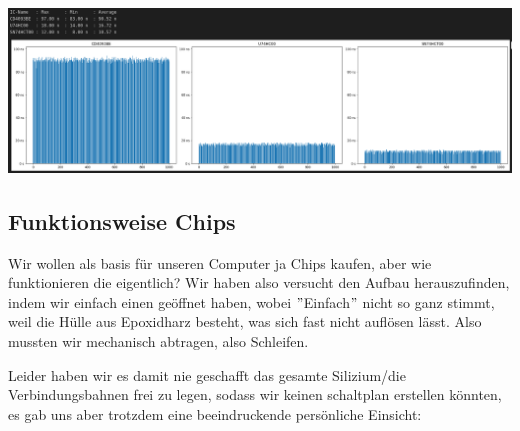 \documentclass{scrartcl}
\begin{document}
    \includegraphics[width=\textwidth]{NANDs_Result_Rising}


    \subsection{Funktionsweise Chips}
    Wir wollen als basis für unseren Computer ja Chips kaufen, aber wie funktionieren die eigentlich?
    Wir haben also versucht den Aufbau herauszufinden, indem wir einfach einen geöffnet haben, wobei $"$Einfach$"$ nicht so ganz stimmt, weil die Hülle aus Epoxidharz besteht, was sich fast nicht auflösen lässt.
    Also mussten wir mechanisch abtragen, also Schleifen.

    Leider haben wir es damit nie geschafft das gesamte Silizium/die Verbindungsbahnen frei zu legen, sodass wir keinen schaltplan erstellen könnten,
    es gab uns aber trotzdem eine beeindruckende persönliche Einsicht:
\end{document}
